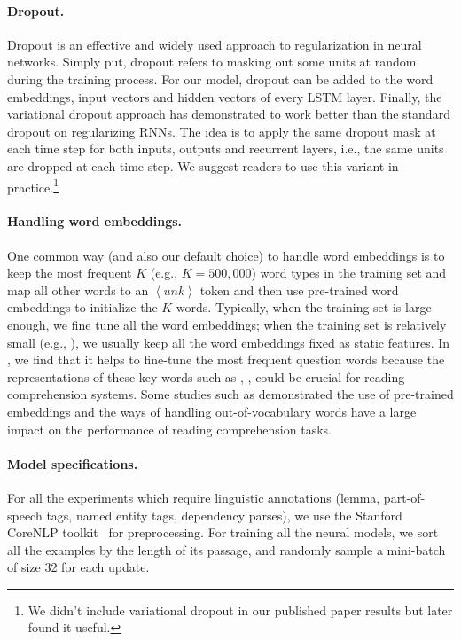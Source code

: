 \paragraph{Dropout.} Dropout is an effective and widely used approach to regularization in neural networks. Simply put, dropout refers to masking out some units at random during the training process. For our model, dropout can be added to the word embeddings, input vectors and hidden vectors of every LSTM layer. Finally, the variational dropout approach \cite{gal2016theoretically} has demonstrated to work better than the standard dropout on regularizing RNNs. The idea is to apply the same dropout mask at each time step for both inputs, outputs and recurrent layers, i.e., the same units are dropped at each time step. We suggest readers to use this variant in practice.\footnote{We didn't include variational dropout in our published paper results but later found it useful.}

\paragraph{Handling word embeddings.} One common way (and also our default choice) to handle word embeddings is to keep the most frequent $K$ (e.g., $K = 500,000$) word types in the training set and map all other words to an $\left<unk\right>$ token and then use pre-trained word embeddings to initialize the $K$ words. Typically, when the training set is large enough, we fine tune all the word embeddings; when the training set is relatively small (e.g., ), we usually keep all the word embeddings fixed as static features. In , we find that it helps to fine-tune the most frequent question words because the representations of these key words such as , ,  could be crucial for reading comprehension systems. Some studies such as \cite{dhingra2017comparative} demonstrated the use of pre-trained embeddings and the ways of handling out-of-vocabulary words have a large impact on the performance of reading comprehension tasks.

\paragraph{Model specifications.}
For all the experiments which require linguistic annotations (lemma, part-of-speech tags, named entity tags, dependency parses), we use the Stanford CoreNLP toolkit~\cite{manning2014stanford} for preprocessing. For training all the neural models, we sort all the examples by the length of its passage, and randomly sample a mini-batch of size 32 for each update.

